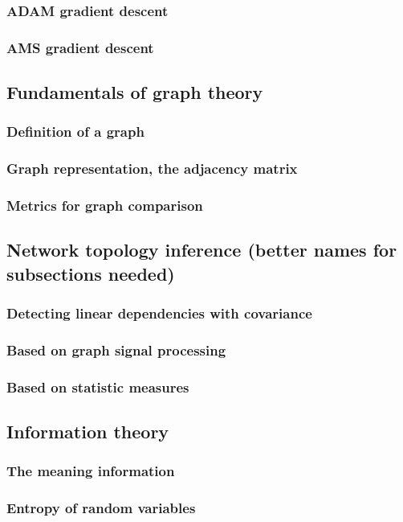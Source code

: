 \documentclass{article}
\begin{document}
\subsubsection{ADAM gradient descent}
\subsubsection{AMS gradient descent}
\subsection{Fundamentals of graph theory}
\subsubsection{Definition of a graph}
\subsubsection{Graph representation, the adjacency matrix}
\subsubsection{Metrics for graph comparison}
\subsection{Network topology inference (\textbf{better names for subsections needed})}
\subsubsection{Detecting linear dependencies with covariance}
\subsubsection{Based on graph signal processing}
\subsubsection{Based on statistic measures}
\subsection{Information theory}
\subsubsection{The meaning information}
\subsubsection{Entropy of random variables}
\end{document}
